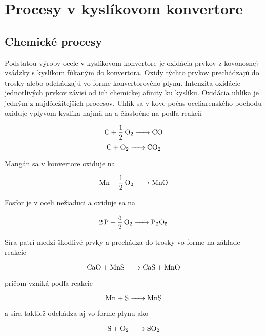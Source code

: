 \section{Procesy v kyslíkovom konvertore}

\subsection{Chemické procesy}

Podstatou výroby ocele v kyslíkovom konvertore je oxidácia prvkov z kovonosnej vsádzky s kyslíkom fúkaným do konvertora. Oxidy týchto prvkov prechádzajú do trosky alebo odchádzajú vo forme konvertorového plynu. Intenzita oxidácie jednotlivých prvkov závisí od ich chemickej afinity ku kyslíku.
Oxidácia uhlíka je jedným z najdôležitejších procesov. Uhlík sa v kove počas
oceliarenského pochodu oxiduje vplyvom kyslíka najmä na  a čiastočne na  podľa reakcií

\begin{equation}
\ce{C + 1/2O2 -> CO}
\end{equation}
\begin{equation}
\ce{C + O2 -> CO2}
\end{equation}

Mangán sa v konvertore oxiduje na 

\begin{equation}
\ce{Mn + 1/2O2 -> MnO}
\end{equation}

Fosfor je v oceli nežiaduci a oxiduje sa na 

\begin{equation}
\ce{2P + 5/2O2 -> P2O5}
\end{equation}

Síra patrí medzi škodlivé prvky a prechádza do trosky vo forme  na základe reakcie 

\begin{equation}
\ce{CaO + MnS -> CaS + MnO}
\end{equation}

pričom  vzniká podľa reakcie

\begin{equation}
\ce{Mn + S -> MnS}
\end{equation}

a síra taktiež odchádza aj vo forme plynu ako 

\begin{equation}
\ce{S + O2 -> SO2}
\end{equation}

